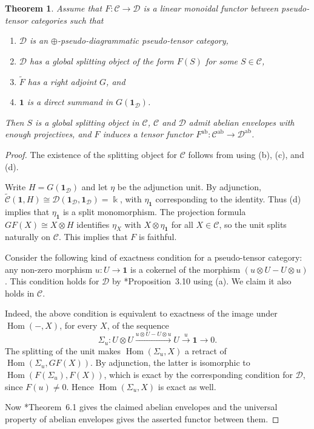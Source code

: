\documentclass[11pt]{amsart}
\newcommand\Cref[1]{\zcref[S]{#1}}
\newtheorem{theorem}{Theorem}[section]
\theoremstyle{definition}
\theoremstyle{remark}
\newcommand\cC{\mathcal C}
\newcommand\cD{\mathcal D}
\newcommand\kk{\Bbbk}
\renewcommand\:\colon
\renewcommand\o\otimes
\newcommand\one{\mathbf{1}}
\newcommand\Hom{\operatorname{Hom}}
\renewcommand\o\otimes
\renewcommand\:\colon
\newcommand\ab{^{\mathrm{ab}}}
\begin{document}
\begin{theorem} \label{thm:adjoint-ab-env}
    Assume that $F\:\cC\to\cD$ is a linear monoidal functor between pseudo-tensor categories such that

    \begin{enumerate}
        \item[(a)] $\cD$ is an $\oplus$-pseudo-diagrammatic pseudo-tensor category,
        \item[(b)] $\cD$ has a global splitting object of the form $F(S)$ for some $S \in \cC$,
        \item[(c)] $\tilde{F}$ has a right adjoint $G$, and
        \item[(d)] $\one$ is a direct summand in $G(\one_\cD)$.
    \end{enumerate}

    Then $S$ is a global splitting object in $\cC$, $\cC$ and $\cD$ admit abelian envelopes with enough projectives, and $F$ induces a tensor functor $F\ab\:\cC\ab\to\cD\ab$.
\end{theorem}

\begin{proof}
The existence of the splitting object for $\cC$ follows from \Cref{l:adjoint-preserves-splitting-objects} using (b), (c), and (d).

Write $H=G(\one_\cD)$ and let $\eta$ be the adjunction unit. By adjunction, $\tilde{\cC}(\one,H)\cong\cD(\one_\cD,\one_\cD)=\kk$, with $\eta_\one$ corresponding to the identity. Thus (d) implies that $\eta_\one$ is a split monomorphism. The projection formula $GF(X)\cong X\o H$ identifies $\eta_X$ with $X\o\eta_\one$ for all $X\in\cC$, so the unit splits naturally on $\cC$. This implies that $F$ is faithful.

Consider the following kind of exactness condition for a pseudo-tensor category: any non-zero morphism $u\:U\to\one$ is a cokernel of the morphism $(u\o U-U\o u)$. This condition holds for $\cD$ by \cite{flake2026monoidaladjunctionsabelianenvelopes}*{Proposition~3.10} using (a). We claim it also holds in $\cC$.

Indeed, the above condition is equivalent to exactness of the image under $\Hom(-,X)$, for every $X$, of the sequence
$$
\Sigma_u \: U\o U\xrightarrow{u\o U-U\o u} U\xrightarrow{u} \one\to 0 .
$$
The splitting of the unit makes $\Hom(\Sigma_u,X)$ a retract of $\Hom(\Sigma_u,GF(X))$. By adjunction, the latter is isomorphic to $\Hom(F(\Sigma_u),F(X))$, which is exact by the corresponding condition for $\cD$, since $F(u)\ne0$. Hence $\Hom(\Sigma_u,X)$ is exact as well.

Now \cite{flake2026monoidaladjunctionsabelianenvelopes}*{Theorem~6.1} gives the claimed abelian envelopes and the universal property of abelian envelopes gives the asserted functor between them.
\end{proof}
\end{document}

